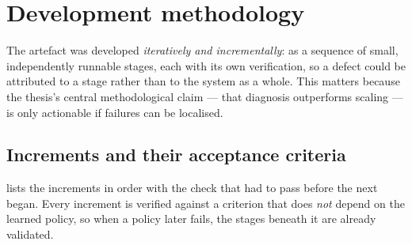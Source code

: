\section{Development methodology}
\label{sec:m-dev}
The artefact was developed \emph{iteratively and incrementally}: as a sequence of
small, independently runnable stages, each with its own verification, so a defect could
be attributed to a stage rather than to the system as a whole. This matters because the
thesis's central methodological claim --- that diagnosis outperforms scaling --- is
only actionable if failures can be localised.

\subsection{Increments and their acceptance criteria}
\label{sec:m-increments}
 lists the increments in order with the check that had to pass
before the next began. Every increment is verified against a criterion that does
\emph{not} depend on the learned policy, so when a policy later fails, the stages
beneath it are already validated.

